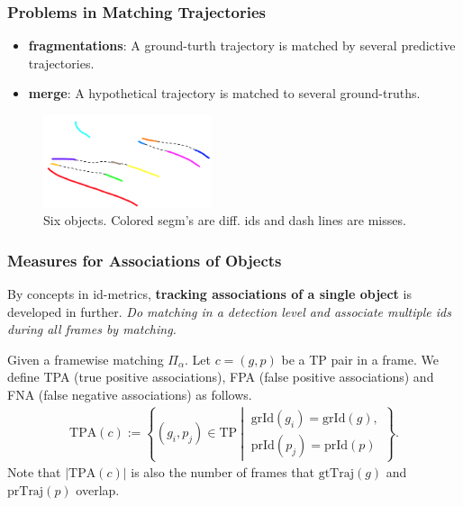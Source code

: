 \documentclass[slidetop, mathserif, dvipsnames]{beamer}
\begin{document}
\begin{frame}
	\frametitle{Problems in Matching Trajectories}
			
	\begin{itemize}
		\item {\bf fragmentations}:
		      A ground-turth trajectory is matched by
		      several predictive trajectories.
		\item {\bf merge}:
		      A hypothetical trajectory is matched to several ground-truths.
	\end{itemize}
	
	\vspace{-15pt}
	\begin{figure}
		\includegraphics[width=140pt]{pics/fig9.png}
		\caption{Six objects. Colored segm's are diff. ids and dash lines are misses.}
	\end{figure}
		
			
\end{frame}

\begin{frame}
	\frametitle{Measures for Associations of Objects}
			
	By concepts in id-metrics,
	{\bf tracking associations of a single object} is developed in further.
	\emph{Do matching in a detection level and associate multiple ids during all
	frames by matching.}
			
	\vspace{5pt}
			
	Given a framewise matching $\Pi_\alpha$.
	Let $c = (g,p)$ be a TP pair in a frame.
	We define TPA (true positive associations), FPA (false positive associations)
	and FNA (false negative associations) as follows.
	\begin{align*}
		\text{TPA}(c) :=                       
		\left\{(g_i, p_j)\in\text{TP}\ \left|\ 
		\begin{array}{c}                       
		\text{grId}(g_i)=\text{grId}(g), \\
		\text{prId}(p_j) = \text{prId}(p)      
		\end{array}\right.                     
		\right\}.                              
	\end{align*}
	Note that $|\text{TPA}(c)|$ is also the number of frames that $\text{gtTraj}(g)$
	and $\text{prTraj}(p)$ overlap.
			
\end{frame}
\end{document}
